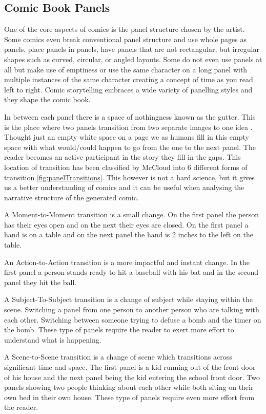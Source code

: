 \subsection*{Comic Book Panels}
One of the core aspects of comics is the panel structure chosen by the artist. Some comics even break conventional panel structure and use whole pages as panels, place panels in panels, have panels that are not rectangular, but irregular shapes such as curved, circular, or angled layouts. Some do not even use panels at all but make use of emptiness or use the same character on a long panel with multiple instances of the same character creating a concept of time as you read left to right. Comic storytelling embraces a wide variety of panelling styles and they shape the comic book.

In between each panel there is a space of nothingness known as the gutter. This is the place where two panels transition from two separate images to one idea \cite{mccloud1993understanding}. Thought just an empty white space on a page we as humans fill in this empty space with what would/could happen to go from the one to the next panel. The reader becomes an active participant in the story they fill in the gaps. This location of transition has been classified by McCloud into 6 different forms of transition \ref{fig:panelTransitions}. This however is not a hard science, but it gives us a better understanding of comics and it can be useful when analysing the narrative structure of the generated comic.

A Moment-to-Moment transition is a small change. On the first panel the person has their eyes open and on the next their eyes are closed. On the first panel a hand is on a table and on the next panel the hand is 2 inches to the left on the table.

An Action-to-Action transition is a more impactful and instant change. In the first panel a person stands ready to hit a baseball with his bat and in the second panel they hit the ball. 

A Subject-To-Subject transition is a change of subject while staying within the scene. Switching a panel from one person to another person who are talking with each other. Switching between someone trying to defuse a bomb and the timer on the bomb. These type of panels require the reader to exert more effort to understand what is happening.

A Scene-to-Scene transition is a change of scene which transitions across significant time and space. The first panel is a kid running out of the front door of his house and the next panel being the kid entering the school front door. Two panels showing two people thinking about each other while both siting on their own bed in their own house. These type of panels require even more effort from the reader.

